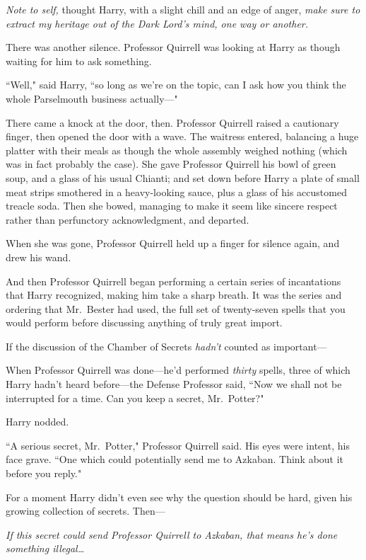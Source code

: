 \emph{Note to self,} thought Harry, with a slight chill and an edge of anger, \emph{make sure to extract my heritage out of the Dark Lord's mind, one way or another.}

There was another silence. Professor Quirrell was looking at Harry as though waiting for him to ask something.

``Well," said Harry, ``so long as we're on the topic, can I ask how you think the whole Parselmouth business actually—"

There came a knock at the door, then. Professor Quirrell raised a cautionary finger, then opened the door with a wave. The waitress entered, balancing a huge platter with their meals as though the whole assembly weighed nothing (which was in fact probably the case). She gave Professor Quirrell his bowl of green soup, and a glass of his usual Chianti; and set down before Harry a plate of small meat strips smothered in a heavy-looking sauce, plus a glass of his accustomed treacle soda. Then she bowed, managing to make it seem like sincere respect rather than perfunctory acknowledgment, and departed.

When she was gone, Professor Quirrell held up a finger for silence again, and drew his wand.

And then Professor Quirrell began performing a certain series of incantations that Harry recognized, making him take a sharp breath. It was the series and ordering that Mr.~Bester had used, the full set of twenty-seven spells that you would perform before discussing anything of truly great import.

If the discussion of the Chamber of Secrets \emph{hadn't} counted as important—

When Professor Quirrell was done—he'd performed \emph{thirty} spells, three of which Harry hadn't heard before—the Defense Professor said, ``Now we shall not be interrupted for a time. Can you keep a secret, Mr.~Potter?"

Harry nodded.

``A serious secret, Mr.~Potter," Professor Quirrell said. His eyes were intent, his face grave. ``One which could potentially send me to Azkaban. Think about it before you reply."

For a moment Harry didn't even see why the question should be hard, given his growing collection of secrets. Then—

\emph{If this secret could send Professor Quirrell to Azkaban, that means he's done something illegal{\ldots}}

